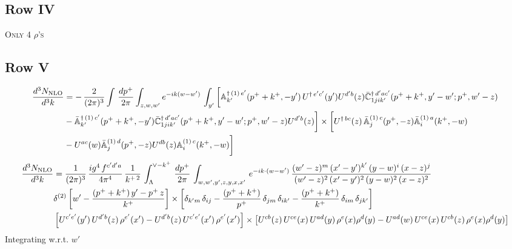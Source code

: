 \documentclass[9pt]{article}
\def\mf#1{\mathbb{#1}}
\numberwithin{equation}{section}
\begin{document}
\subsection{Row IV\,}
\textsc{Only 4 $\rho$'s}
\subsection{Row V\,}
\begin{align}
 \frac{d^{3}N_{\rm NLO}}{d^{3}k} & =   -\,\frac{2}{(2\pi)^{3}} \int\, \frac{dp^{+}}{2\pi}\int_{z,w,w^{\prime}} e^{-ik(w-w^{\prime})}\,\int_{y^{\prime}}\bigg[\mf{A}^{\dagger\, (1)\,e^{\prime}}_{k^{\prime}}(p^{+}+k^{+},-y^{\prime})\,U^{\dagger\, e^{\prime}c^{\prime}}(y^{\prime})U^{d^{\prime}b}(z) \Bar{\mf{C}}^{\dagger\, d^{\prime}ac^{\prime}}_{1jik^{\prime}}(p^{+}+k^{+},y^{\prime}-w^{\prime}; p^{+},w^{\prime}-z) \notag \\ & -\Bar{\mf{A}}^{\dagger\, (1)\,c^{\prime}}_{k^{\prime}}(p^{+}+k^{+},-y^{\prime}) \Bar{\mf{C}}^{\dagger\, d^{\prime}ac^{\prime}}_{1jik^{\prime}}(p^{+}+k^{+},y^{\prime}-w^{\prime}; p^{+},w^{\prime}-z)U^{d^{\prime}b}(z)\bigg] \times  \bigg[U^{\dagger\,bc}(z)\,\Bar{\mf{A}}^{(1)\, c}_{j}(p^{+},-z)\Bar{\mf{A}}^{(1)\, a}_{i}(k^{+},-w)\notag \\ & -U^{ac}(w) \Bar{\mf{A}}^{(1)\, d}_{j}(p^{+},-z)U^{db}(z) \mf{A}^{(1)\, c}_{i}(k^{+},- w)\bigg]\nonumber
\end{align}
\begin{align}
     \frac{d^{3}N_{\rm NLO}}{d^{3}k} & = \frac{1}{(2\pi)^{3}}\,\frac{ig^{4}\,f^{c'd'a}}{4\pi^{4}}\, \frac{1}{k^{+\,2}}\,\int_{\Lambda}^{\vee-k^{+}}\, \frac{dp^{+}}{2\pi}\, \int_{w,w',y',z,y,x,x'}\, e^{-ik\cdot (w-w')}\, \frac{(w'-z)^{m}\,(x'-y')^{k'}\,(y-w)^{i}\,(x-z)^{j}}{(w'-z)^{2}\,(x'-y')^{2}\,(y-w)^{2}\,(x-z)^{2}}\notag \\ & \delta^{(2)}\left[w'-\frac{(p^{+}+k^{+})\,y'-p^{+}\,z}{k^{+}}\right]\times \left[\delta_{k'm}\,\delta_{ij}-\frac{(p^{+}+k^{+})}{p^{+}}\,\delta_{jm}\,\delta_{ik'}-\frac{(p^{+}+k^{+})}{k^{+}}\, \delta_{im}\, \delta_{jk'}\right]\notag \\ & \left[U^{c'e'}(y')\,U^{d'b}(z)\,\rho^{e'}(x')-U^{d'b}(z)\,U^{c'e'}(x')\,\rho^{e'}(x')\right]\times \left[U^{cb}(z)\,U^{ce}(x)\,U^{ad}(y)\,\rho^{e}(x)\rho^{d}(y)-U^{ad}(w)\,U^{ce}(x)\,U^{cb}(z)\,\rho^{e}(x)\rho^{d}(y)\right]
\end{align}
Integrating w.r.t. $w'$
\end{document}
